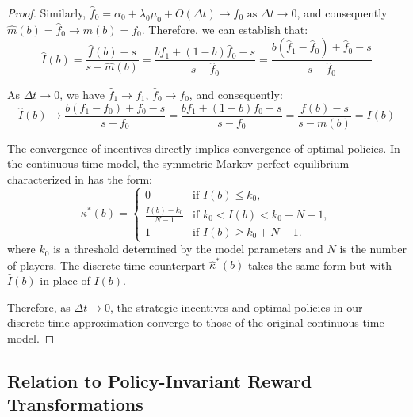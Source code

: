 \documentclass[a4paper,12pt]{report}
\begin{document}
\begin{proof}
        Similarly, $\hat{f}_0 = \alpha_0 + \lambda_0\mu_0 + O(\Delta t) \to f_0 \text{ as } \Delta t \to 0$, and consequently $\hat{m}(b) = \hat{f}_0 \to m(b) = f_0$.
        Therefore, we can establish that:
        \begin{equation}
            \hat{I}(b) = \frac{\hat{f}(b) - s}{s - \hat{m}(b)} = \frac{b \hat{f}_1 + (1-b) \hat{f}_0 - s}{s - \hat{f}_0} = \frac{b(\hat{f}_1 - \hat{f}_0) + \hat{f}_0 - s}{s - \hat{f}_0}
        \end{equation}

        As $\Delta t \to 0$, we have $\hat{f}_1 \to f_1$, $\hat{f}_0 \to f_0$, and consequently:
        \begin{equation}
            \hat{I}(b) \to \frac{b(f_1 - f_0) + f_0 - s}{s - f_0} = \frac{b f_1 + (1-b) f_0 - s}{s - f_0} = \frac{f(b) - s}{s - m(b)} = I(b)
        \end{equation}

        The convergence of incentives directly implies convergence of optimal policies. In the continuous-time model, the symmetric Markov perfect equilibrium characterized in \citet{keller2020undiscounted} has the form:
        \begin{equation}
            \kappa^*(b) =
            \begin{cases}
                0                    & \text{if } I(b) \leq k_0,            \\
                \frac{I(b)-k_0}{N-1} & \text{if } k_0 < I(b) < k_0 + N - 1, \\
                1                    & \text{if } I(b) \geq k_0 + N - 1.
            \end{cases}
        \end{equation}
        where $k_0$ is a threshold determined by the model parameters and $N$ is the number of players. The discrete-time counterpart $\hat{\kappa}^*(b)$ takes the same form but with $\hat{I}(b)$ in place of $I(b)$.

        Therefore, as $\Delta t \to 0$, the strategic incentives and optimal policies in our discrete-time approximation converge to those of the original continuous-time model.
    \end{proof}

\fi
\subsection{Relation to Policy-Invariant Reward Transformations}
\label{appendix:policy_invariance}
\end{document}
